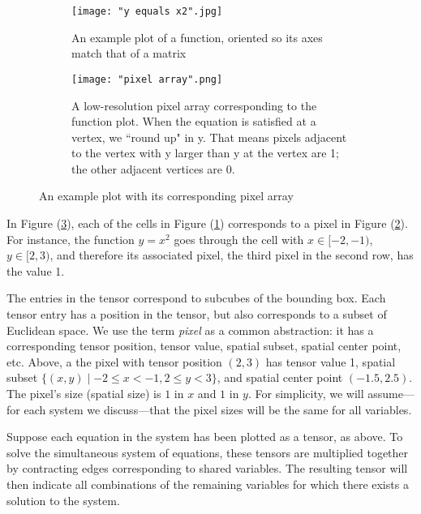 \documentclass[11pt]{article}
\begin{document}
\begin{figure}[h]
\begin{subfigure}{.4\textwidth}
  \centering
  \captionsetup{width=0.8\textwidth}
  \texttt{[image: "y equals x2".jpg]}
  \caption{An example plot of a function, oriented so its axes match that of a matrix\\\vspace{.6in}}
  \label{sample_function}
\end{subfigure}%
\begin{subfigure}{.4\textwidth}
  \centering
  \captionsetup{width=0.84\textwidth}
  \texttt{[image: "pixel array".png]}
  \caption{A low-resolution pixel array corresponding to the function plot. When the equation is satisfied at a vertex, we ``round up" in y. That means pixels adjacent to the vertex with y larger than y at the vertex are 1; the other adjacent vertices are 0.}
  \label{sample_pixel_array}
\end{subfigure}%
\caption{An example plot with its corresponding pixel array}
\label{plot_and_pa}
\end{figure}

In Figure (\ref{plot_and_pa}), each of the cells in Figure (\ref{sample_function}) corresponds to a pixel in Figure (\ref{sample_pixel_array}). For instance, the function $y=x^2$ goes through the cell with $x \in [-2,-1)$, $y \in [2,3)$, and therefore its associated pixel, the third pixel in the second row, has the value 1.

The entries in the tensor correspond to subcubes of the bounding box. Each tensor entry has a position in the tensor, but also corresponds to a subset of Euclidean space. We use the term \emph{pixel} as a common abstraction: it has a corresponding tensor position, tensor value, spatial subset, spatial center point, etc. Above, a the pixel with tensor position $(2,3)$ has tensor value 1, spatial subset $\{(x,y)\mid-2\leq x<-1, 2\leq y<3\}$, and spatial center point $(-1.5, 2.5)$. The pixel's size (spatial size) is $1$ in $x$ and $1$ in $y$. For simplicity, we will assume---for each system we discuss---that the pixel sizes will be the same for all variables.

Suppose each equation in the system has been plotted as a tensor, as above. To solve the simultaneous system of equations, these tensors are multiplied together by contracting edges corresponding to shared variables. The resulting tensor will then indicate all combinations of the remaining variables for which there exists a solution to the system.
\end{document}
